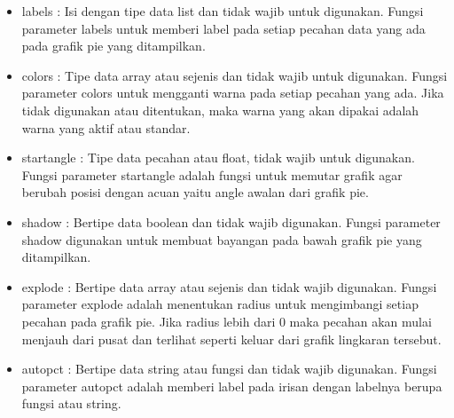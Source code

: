 \begin {enumerate}
\begin{itemize}
	\item labels : Isi dengan tipe data list dan tidak wajib untuk digunakan. Fungsi parameter labels untuk memberi label pada setiap pecahan data yang ada pada grafik pie yang ditampilkan.
	\item colors : Tipe data array atau sejenis dan tidak wajib untuk digunakan. Fungsi parameter colors untuk mengganti warna pada setiap pecahan yang ada. Jika tidak digunakan atau ditentukan, maka warna yang akan dipakai adalah warna yang aktif atau standar.
	\item startangle : Tipe data pecahan atau float, tidak wajib untuk digunakan. Fungsi parameter startangle adalah fungsi untuk memutar grafik agar berubah posisi dengan acuan yaitu angle awalan dari grafik pie.
	\item shadow : Bertipe data boolean dan tidak wajib digunakan. Fungsi parameter shadow digunakan untuk membuat bayangan pada bawah grafik pie yang ditampilkan. 
	\item explode : Bertipe data array atau sejenis dan tidak wajib digunakan. Fungsi parameter explode adalah menentukan radius untuk mengimbangi setiap pecahan pada grafik pie. Jika radius lebih dari 0 maka pecahan akan mulai menjauh dari pusat dan terlihat seperti keluar dari grafik lingkaran tersebut.
	\item autopct : Bertipe data string atau fungsi dan tidak wajib digunakan. Fungsi parameter autopct adalah memberi label pada irisan dengan labelnya berupa fungsi atau string. 
			\end{itemize}
	\end {enumerate}